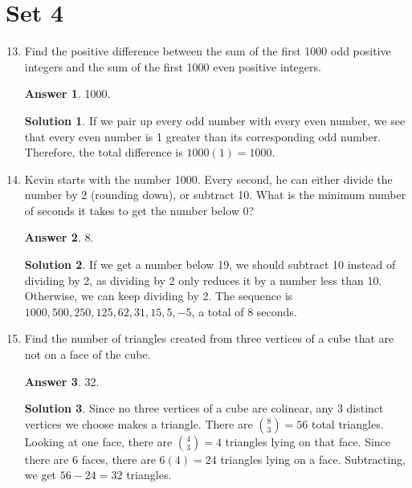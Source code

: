 \documentclass[11pt]{article}
\theoremstyle{definition}
\newtheorem*{solution}{Solution}
\newtheorem*{answer}{Answer}
\begin{document}
\section*{Set 4}
\begin{enumerate}
\setcounter{enumi}{12}

\item Find the positive difference between the sum of the first 1000 odd positive integers and the sum of the first 1000 even positive integers.

\begin{answer}
1000.
\end{answer}
\begin{solution} If we pair up every odd number with every even number, we see that every even number is 1 greater than its corresponding odd number. Therefore, the total difference is $1000(1) = \boxed{1000}$.

\end{solution}

\item Kevin starts with the number 1000. Every second, he can either divide the number by 2 (rounding down), or subtract 10. What is the minimum number of seconds it takes to get the number below 0?

\begin{answer}
8.
\end{answer}
\begin{solution} If we get a number below 19, we should subtract 10 instead of dividing by 2, as dividing by 2 only reduces it by a number less than 10. Otherwise, we can keep dividing by 2. The sequence is $1000,500,250,125,62,31,15,5,-5$, a total of $\boxed{8}$ seconds.

\end{solution}

\item Find the number of triangles created from three vertices of a cube that are not on a face of the cube.

\begin{answer}
32.
\end{answer}
\begin{solution} Since no three vertices of a cube are colinear, any 3 distinct vertices we choose makes a triangle. There are $\displaystyle \binom{8}{3} = 56$ total triangles. Looking at one face, there are $\displaystyle \binom{4}{3} = 4$ triangles lying on that face. Since there are 6 faces, there are $6(4) = 24$ triangles lying on a face. Subtracting, we get $56 - 24 = \boxed{32}$ triangles.


\end{solution}
\end{enumerate}
\end{document}
